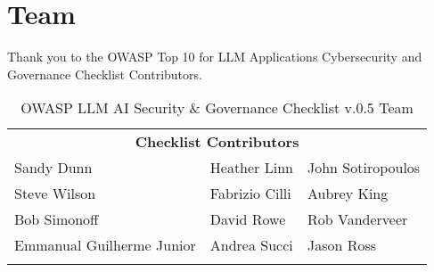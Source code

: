 

\headerimage
\chapter{Team}

Thank you to the OWASP Top 10 for LLM Applications Cybersecurity and Governance
Checklist Contributors.

\setlength\LTleft{0pt}
\setlength\LTright{0pt}
\begin{longtable}[c]{|p{}|p{}|p{}|}
  \hline
  \rowcolor{owasplightpurple}
  \multicolumn{3}{|c|}{
    \textbf{Checklist Contributors}
  } \\
  \hline
  \endfirsthead
  \hline
  \multicolumn{3}{|c|}{
    \textbf{Checklist Contributors}
  } \\
  \hline
  \endhead
  \endfoot
\hline
  Sandy Dunn & Heather Linn & John Sotiropoulos   \\
  \hline
  Steve Wilson & Fabrizio Cilli & Aubrey King     \\
  \hline
  Bob Simonoff & David Rowe & Rob Vanderveer      \\
  \hline
  Emmanual Guilherme Junior & Andrea Succi & Jason Ross \\
  \hline
  \caption{OWASP LLM AI Security \& Governance Checklist v.0.5 Team}
  \label{tab:team}
\end{longtable}
